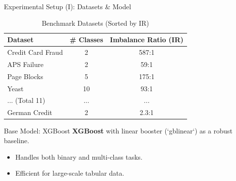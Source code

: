 \documentclass[aspectratio=169]{beamer}
\begin{document}
\begin{frame}{Experimental Setup (I): Datasets & Model}

\vspace{0.02\textwidth}
\begin{table}
    \centering
    \caption{Benchmark Datasets (Sorted by IR)}
    \small %
    \begin{tabular}{lcc}
        \toprule
        \textbf{Dataset} & \textbf{\# Classes} & \textbf{Imbalance Ratio (IR)} \\
        \midrule
        Credit Card Fraud & 2 & 587:1 \\
        APS Failure & 2 & 59:1 \\
        Page Blocks & 5 & 175:1 \\
        Yeast & 10 & 93:1 \\
        ... (Total 11) & ... & ... \\
        German Credit & 2 & 2.3:1 \\
        \bottomrule
    \end{tabular}
\end{table}

\begin{block}{Base Model: XGBoost}
    \textbf{XGBoost} with linear booster (`gblinear`) as a robust baseline.
    \begin{itemize}
        \item Handles both binary and multi-class tasks.
        \item Efficient for large-scale tabular data.
    \end{itemize}
\end{block}


\end{frame}
\end{document}
